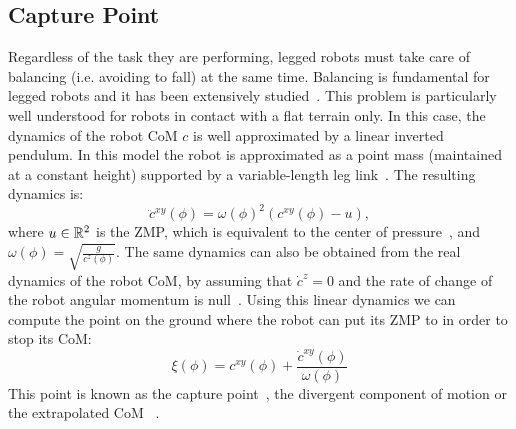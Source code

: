 \subsection{Capture Point}
Regardless of the task they are performing, legged robots must take care of balancing (i.e. avoiding to fall) at the same time.
Balancing is fundamental for legged robots and it has been extensively studied~\cite{Collette2008,Morisawa2012,Goswami2004,Hyon2006,Sherikov}.
This problem is particularly well understood for robots in contact with a flat terrain only.
In this case, the dynamics of the robot CoM $c$ is well approximated by a linear inverted pendulum.
In this model the robot is approximated as a point mass (maintained at a constant height) supported by a variable-length leg link~\cite{Pratt2006}.
The resulting dynamics is:
\begin{equation*}
\ddot{c}^{xy}(\phi) = \omega(\phi)^2 (c^{xy}(\phi) - u),
\end{equation*}
where $u \in \mathbb{R}^{2}$ is the ZMP, which is equivalent to the center of pressure~\cite{Wieber2002}, and \mbox{$\omega(\phi) = \sqrt{\frac{g}{c^z(\phi)}}$}.
The same dynamics can also be obtained from the real dynamics of the robot CoM, by assuming that $\dot{c}^z=0$ and the rate of change of the robot angular momentum is null~\cite{Wieber}.
Using this linear dynamics we can compute the point on the ground where the robot can put its ZMP to in order to stop its CoM:
\begin{equation*}
\xi(\phi) = c^{xy}(\phi) + \frac{\dot{c}^{xy}(\phi)}{\omega(\phi)}
\end{equation*}
This point is known as the capture point~\cite{Pratt2006}, the divergent component of motion or the extrapolated CoM ~\cite{Wieber}.

